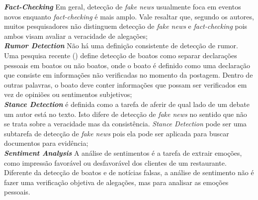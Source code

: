 \textbf{\textit{Fact-Checking}} Em geral, detecção de \textit{fake news} usualmente foca em eventos novos enquanto \textit{fact-checking} é mais amplo. Vale resaltar que, segundo os autores, muitos pesquisadores não distinguem detecção de \textit{fake news} e \textit{fact-checking} pois ambos visam avaliar a veracidade de alegações;  \\

\textbf{\textit{Rumor Detection}} Não há uma definição consistente de detecção de rumor. Uma pesquisa recente (\cite{zubiaga2018}) define detecção de boatos como separar declarações pessoais em boatos ou não boatos, onde o boato é definido como uma declaração que consiste em informações não verificadas no momento da postagem. Dentro de outras palavras, o boato deve conter informações que possam ser verificados em vez de opiniões ou sentimentos subjetivos; \\


\textbf{\textit{Stance Detection}} é definida como a tarefa de aferir de qual lado de um debate um autor está no texto. Isto difere de detecção de \textit{fake news} no sentido que não se trata sobre a veracidade mas da consistência. \textit{Stance Detection} pode ser uma subtarefa de detecção de \textit{fake news} pois ela pode ser aplicada para buscar documentos para evidência; \\


\textbf{\textit{Sentiment Analysis}} A análise de sentimentos é a tarefa de extrair emoções, como impressão favorável ou desfavorável dos clientes de um restaurante. Diferente da detecção de boatos e de notícias falsas, a análise de sentimento não é fazer uma verificação objetiva de alegações, mas para analisar as emoções pessoais. \\


